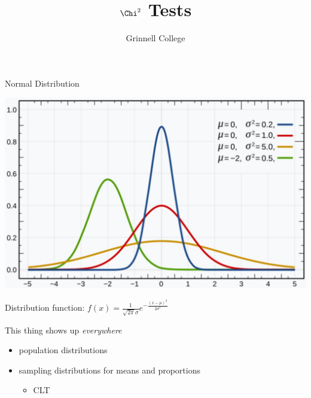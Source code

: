 \documentclass{beamer}
\title[Introduction to Statistics]{$\Chi^2$ Tests}
\subtitle{}
\author{Grinnell College}
\date{}
\begin{document}
\begin{frame}
  \titlepage
\end{frame}

\begin{frame}{Normal Distribution}
\begin{center}
    \includegraphics[scale=.4]{img/normaldist.jpg}
\end{center}
Distribution function: $f(x) = \frac{1}{\sqrt{2\pi}\sigma}e^{-\frac{(x-\mu)^2}{2\sigma^2}}$ \vspace{2mm}

This thing shows up \textit{everywhere}
\begin{itemize}
    \item population distributions
    \item sampling distributions for means and proportions
    \begin{itemize}
        \item CLT
    \end{itemize}
\end{itemize}
\end{frame}
\end{document}
